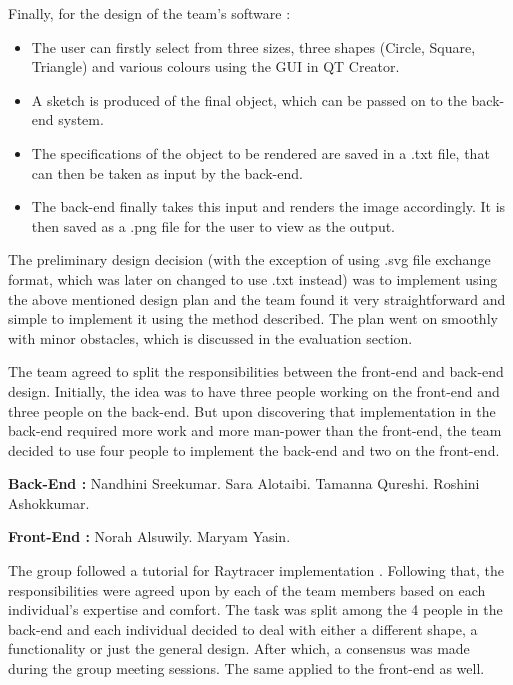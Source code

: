 \documentclass{article}
\begin{document}
\begin{itemize}
Finally, for the design of the team’s software :
\begin{itemize}
    \item 	The user can firstly select from three sizes, three shapes (Circle, Square, Triangle) and various colours using the GUI in QT Creator. 
\item	A sketch is produced of the final object, which can be passed on to the back-end system.
\item	The specifications of the object to be rendered are saved in a .txt file, that can then be taken as input by the back-end.
\item	The back-end finally takes this input and renders the image accordingly. It is then saved as a .png file for the user to view as the output.
\end{itemize}
The preliminary design decision (with the exception of using .svg file exchange format, which was later on changed to use .txt instead) was to implement using the above mentioned design plan and the team found it very straightforward and simple to implement it using the method described. The plan went on smoothly with minor obstacles, which is discussed in the evaluation section. 

The team agreed to split the responsibilities between the front-end and back-end design. Initially, the idea was to have three people working on the front-end and three people on the back-end. But upon discovering that implementation in the back-end required more work and more man-power than the front-end, the team decided to use four people to implement the back-end and two on the front-end.
\newline

\textbf{Back-End :} \newline
Nandhini Sreekumar. \newline Sara Alotaibi. \newline Tamanna Qureshi. \newline Roshini Ashokkumar.

\textbf{Front-End :} \newline
Norah Alsuwily. \newline Maryam Yasin.

The group followed a tutorial for Raytracer implementation \cite{11}. Following that, the responsibilities were agreed upon by each of the team members based on each individual’s expertise and comfort. The task was split among the 4 people in the back-end and each individual decided to deal with either a different shape, a functionality or just the general design. After which, a consensus was made during the group meeting sessions. The same applied to the front-end as well. 


\end{itemize}
\end{document}
